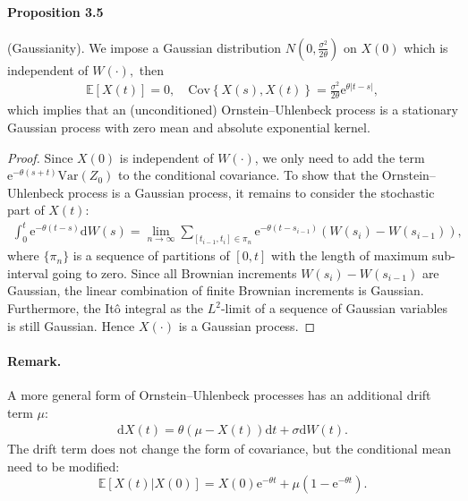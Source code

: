 \documentclass{article}
\begin{document}
\paragraph{Proposition 3.5} (Gaussianity). We impose a Gaussian distribution $N(0,\frac{\sigma^2}{2\theta})$ on $X(0)$ which is independent of $W(\cdot),$ then
\begin{align*}
	\mathbb{E}[X(t)] = 0,\quad
	\mathrm{Cov}\left\lbrace X(s), X(t)\right\rbrace = \frac{\sigma^2}{2\theta}\mathrm{e}^{\theta\vert t-s\vert},\tag{3.20}
\end{align*}
which implies that an (unconditioned) Ornstein–Uhlenbeck process is a stationary Gaussian process with zero mean and absolute exponential kernel.
\begin{proof}
Since $X(0)$ is independent of $W(\cdot)$, we only need to add the term $\mathrm{e}^{-\theta(s+t)}\mathrm{Var}(Z_0)$ to the conditional covariance. To show that the Ornstein–Uhlenbeck process is a Gaussian process, it remains to consider the stochastic part of $X(t):$
\begin{align*}
	\int_0^t\mathrm{e}^{-\theta(t-s)}\mathrm{d}W(s) = \lim_{n \to \infty}\sum_{[t_{i-1},t_i]\in \pi_n}\mathrm{e}^{-\theta(t-s_{i-1})}\left(W(s_i) - W(s_{i-1})\right),\tag{3.21}
\end{align*}
where $\lbrace\pi_n\rbrace$ is a sequence of partitions of $[0,t]$ with the length of maximum sub-interval going to zero. Since all Brownian increments $W(s_i) - W(s_{i-1})$ are Gaussian,  the linear combination of finite Brownian increments is Gaussian. Furthermore, the Itô integral as the $L^2$-limit of a sequence of Gaussian variables is still Gaussian. Hence $X(\cdot)$ is a Gaussian process.
\end{proof}

\paragraph{Remark.} A more general form of Ornstein–Uhlenbeck processes has an additional drift term $\mu$:
\begin{align*}
	\mathrm{d}X(t) = \theta (\mu -X(t))\mathrm{d}t + \sigma\mathrm{d}W(t).\tag{3.22}
\end{align*}
The drift term does not change the form of covariance, but the conditional mean need to be modified:
\begin{equation*}
	\mathbb{E}[X(t)\vert X(0)] = X(0)\mathrm{e}^{-\theta t} + \mu(1-\mathrm{e}^{-\theta t}).\tag{3.23}
\end{equation*}
\end{document}
